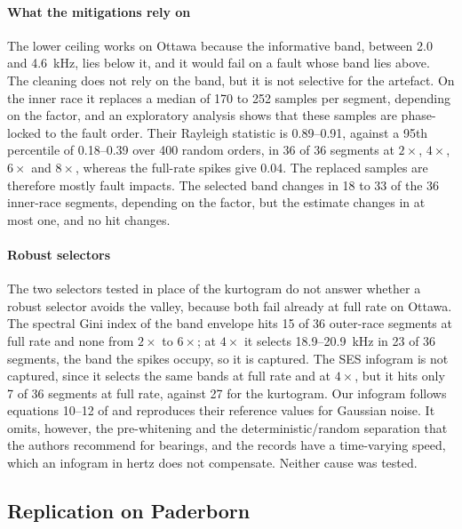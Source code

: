 \paragraph{What the mitigations rely on} The lower ceiling works on Ottawa because the informative
band, between 2.0 and 4.6~kHz, lies below it, and it would fail on a fault whose band lies above.
The cleaning does not rely on the band, but it is not selective for the artefact. On the inner race
it replaces a median of 170 to 252 samples per segment, depending on the factor, and an exploratory
analysis shows that these samples are phase-locked to the fault order. Their Rayleigh statistic is
0.89--0.91, against a 95th percentile of 0.18--0.39 over 400 random orders, in 36 of 36 segments at
$2\times$, $4\times$, $6\times$ and $8\times$, whereas the full-rate spikes give 0.04. The replaced
samples are therefore mostly fault impacts. The selected band changes in 18 to 33 of the 36
inner-race segments, depending on the factor, but the estimate changes in at most one, and no hit
changes.

\paragraph{Robust selectors} The two selectors tested in place of the kurtogram do not answer
whether a robust selector avoids the valley, because both fail already at full rate on Ottawa. The
spectral Gini index of the band envelope hits 15 of 36 outer-race segments at full rate and none
from $2\times$ to $6\times$; at $4\times$ it selects 18.9--20.9~kHz in 23 of 36 segments, the band
the spikes occupy, so it is captured. The SES infogram is not captured, since it selects the same
bands at full rate and at $4\times$, but it hits only 7 of 36 segments at full rate, against 27 for
the kurtogram. Our infogram follows equations 10--12 of \citet{antoni2016infogram} and reproduces
their reference values for Gaussian noise. It omits, however, the pre-whitening and the
deterministic/random separation that the authors recommend for bearings, and the records have a
time-varying speed, which an infogram in hertz does not compensate. Neither cause was tested.

\subsection{Replication on Paderborn}
\label{sec:res-paderborn}

